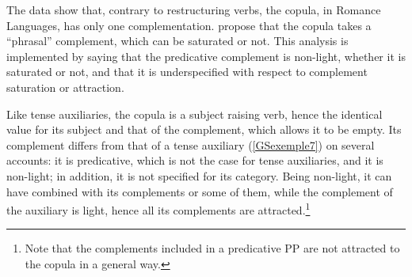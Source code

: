 \documentclass[output=paper]{langsci/langscibook}
\begin{document}
{\begin{exe}
	\ex \label{GSexemple34} 
	\begin{xlist}
        \label{GSexemple34a}

		\label{GSexemple34b}
		
		\label{GSexemple34c}
	\end{xlist}
\end{exe}

The data show that, contrary to restructuring verbs, the copula, in Romance Languages, has only one complementation. \cite{AG2002b-u, AG2010} propose that the copula takes a ``phrasal'' complement, which can be saturated or not. This analysis is implemented by saying that the predicative complement is non-light, whether it is saturated or not, and that it is underspecified with respect to complement saturation or attraction.

\begin{exe}
        \label{GSexemple35}
\end{exe}

Like tense auxiliaries, the copula is a subject raising verb, hence the identical value  for its subject and that of the complement, which allows it to be empty. Its complement differs from that of a tense auxiliary (\ref{GSexemple7}) on several accounts: it is predicative, which is not the case for tense auxiliaries, and it is non-light; in addition, it is not specified for its category. Being non-light, it can have combined with its complements or some of them, while the complement of the auxiliary is light, hence all its complements are attracted.\footnote{Note that the complements included in a predicative PP are not attracted to the copula in a general way.}  

}
\end{document}
